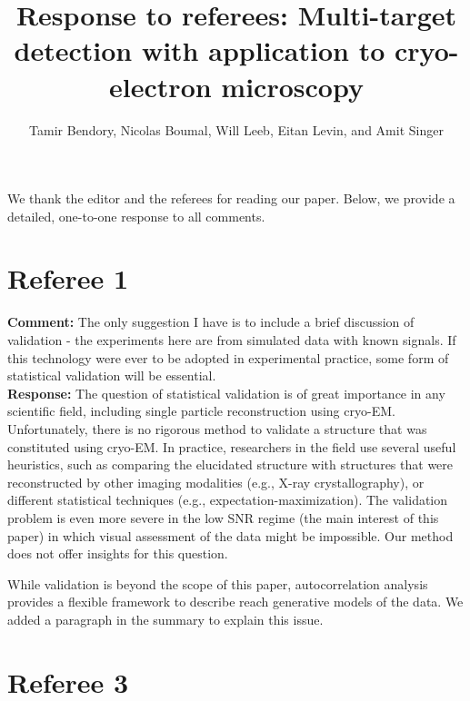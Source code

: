 \documentclass[12pt]{article}
\newcommand{\1}{\mathbf{1}}
\theoremstyle{plain}
\theoremstyle{definition}
\theoremstyle{remark}
\theoremstyle{plain}
\theoremstyle{remark}
\theoremstyle{plain}
\theoremstyle{plain}
\theoremstyle{plain}
\numberwithin{equation}{section}
\begin{document}


\title{Response to referees: Multi-target detection with application to cryo-electron microscopy}

\author{Tamir Bendory, Nicolas Boumal, Will Leeb, Eitan Levin, and Amit Singer}

\date{}
\maketitle

We thank the editor and the referees for reading our paper. Below, we provide a detailed, one-to-one response to all comments. 

\section{Referee 1}

\noindent \textbf{Comment:} The only suggestion I have is to include a brief discussion of validation - the experiments here are from simulated data with known signals. If this technology were ever to be adopted in experimental practice, some form of statistical validation will be essential.\\

\noindent \textbf{Response:} The question of statistical validation is of great importance in any scientific field, including single particle reconstruction using cryo-EM. %
Unfortunately,  there is  no rigorous method to validate a structure that was constituted using cryo-EM. In practice, researchers in the field use several useful heuristics, such as  comparing the elucidated structure with structures that were reconstructed by other imaging modalities (e.g., X-ray crystallography), or different statistical techniques (e.g., expectation-maximization). The validation problem is even more severe in the low SNR regime (the main interest of this paper) in which visual assessment of the data might be impossible. Our method does not offer insights for this question.

While validation is beyond the scope of this paper, autocorrelation analysis provides a flexible framework to describe reach generative models of the data. We added a paragraph in the summary to explain this issue. 
 

\section{Referee 3}
\end{document}
